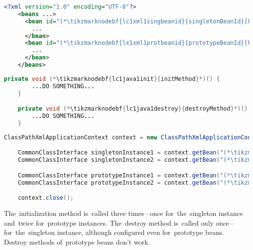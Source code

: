 \example
\begin{lstlisting}[language=XML, title={Configuration XML}]
    <?xml version="1.0" encoding="UTF-8"?>
    <beans ...>
      <bean id="(*\tikzmarknodebf{lc1xml1singbeanid}{singletonBeanId}[ForestGreen]*)" class="package.subfolder.CommonClass" init-method="(*\tikzmarknodebf{lc1xml1singinit}{initMethod}[ForestGreen]*)" destroy-method="(*\tikzmarknodebf{lc1xml1singdestroy}{destroyMethod}[ForestGreen]*)">
        ...
      </bean>
      <bean id="(*\tikzmarknodebf{lx1xml1protbeanid}{prototypeBeanId}[ForestGreen]*)" class="package.subfolder.CommonClass" scope="prototype" init-method="(*\tikzmarknodebf{lc1xml1protinit}{initMethod}[ForestGreen]*)" destroy-method="(*\tikzmarknodebf{lc1xml1protdestroy}{destroyMethod}[ForestGreen]*)">
        ...
      </bean>
    </beans>
\end{lstlisting}
\begin{lstlisting}[language=Java, title={Common class for singleton and prototype beans}]
    private void (*\tikzmarknodebf{lc1java1init}{initMethod}*)() {
        ...DO SOMETHING...
    }

    private void (*\tikzmarknodebf{lc1java1destroy}{destroyMethod}*)() {
        ...DO SOMETHING...
    }
\end{lstlisting}
\begin{lstlisting}[language=Java, title={Usage}]
    ClassPathXmlApplicationContext context = new ClassPathXmlApplicationContext("configurationFile.xml");

    CommonClassInterface singletonInstance1 = context.getBean("(*\tikzmarknodebf{lc1java1singbeanid1}{singletonBeanId}[ForestGreen]*)", CommonClassInterface.class);
    CommonClassInterface singletonInstance2 = context.getBean("(*\tikzmarknodebf{lc1java1singbeanid2}{singletonBeanId}[ForestGreen]*)", CommonClassInterface.class);

    CommonClassInterface prototypeInstance1 = context.getBean("(*\tikzmarknodebf{lc1java1protbeanid1}{prototypeBeanId}[ForestGreen]*)", CommonClassInterface.class);
    CommonClassInterface prototypeInstance2 = context.getBean("(*\tikzmarknodebf{lc1java1protbeanid2}{prototypeBeanId}[ForestGreen]*)", CommonClassInterface.class);

    context.close();
\end{lstlisting}

\noindent The~initialization method is~called three times\,--\,once for~the~singleton instance and~twice for~prototype instances. The~destroy method is~called only once\,--\,for~the~singleton instance, although configured even for~prototype beans. Destroy methods of~prototype beans don't work.